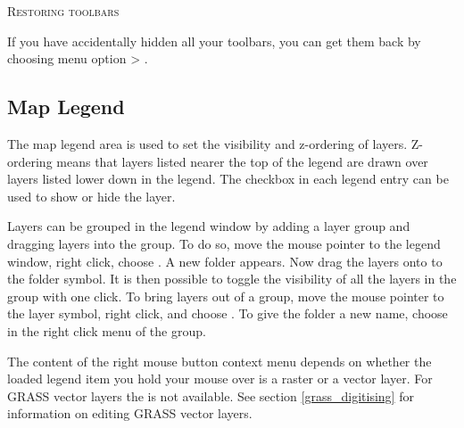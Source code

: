 \begin{Tip}
\caption{\textsc{Restoring toolbars}} 
If you have accidentally hidden all your toolbars, you can get them
back by choosing menu option  > .
\end{Tip}

\subsection{Map Legend}\label{label_legend}

The map legend area is used to set the visibility and z-ordering of layers.
Z-ordering means that layers listed nearer the top of the legend are drawn
over layers listed lower down in the legend. The checkbox in each legend
entry can be used to show or hide the layer.

Layers can be grouped in the legend window by adding a layer group and dragging layers 
into the group. To do so, move the mouse pointer to the legend window, right click, choose . 
A new folder appears. Now drag the layers onto to the folder symbol. It is then possible to toggle the 
visibility of all the layers in the group with one click. To bring layers out of a group, move 
the mouse pointer to the layer symbol, right click, and choose . To give the folder a 
new name, choose  in the right click menu of the group.

The content of the right mouse button context menu depends on whether the loaded legend item you hold your 
mouse over is a raster or a vector layer. For GRASS vector layers the  is not 
available. See section \ref{grass_digitising} for information on editing GRASS vector layers. 

